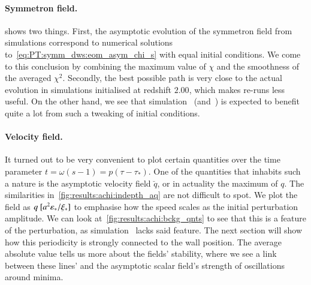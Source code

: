 \paragraph{Symmetron field.} %
 shows two things. First, the asymptotic evolution of the symmetron field from simulations correspond to numerical solutions to~\cref{eq:PT:symm_dws:eom_asym_chi_s} with equal initial conditions. We come to this conclusion by combining the maximum value of $\chi$ and the smoothness of the averaged $\chi^2$. Secondly, the best possible path %
is very close to the actual evolution in simulations initialised at redshift $2.00$, which makes re-runs less useful. On the other hand, we see that simulation~ (and~) is expected to benefit quite a lot from such a tweaking of initial conditions.


\paragraph{Velocity field.} %
It turned out to be very convenient to plot certain quantities over the  time parameter $t = \omega(s-1)=p(\tau-\tau_\ast)$. One of the quantities that inhabits such a nature is the asymptotic velocity field $\breve{q}$, or in actuality the maximum of $q$. %
The similarities in~\cref{fig:results:achi:indepth_aq} are not difficult to spot. We plot the field as $q~[a^2 \varepsilon_\ast/\xi_\ast]$ %
to emphasise how the speed scales as the initial perturbation amplitude. We can look at~\cref{fig:results:achi:bckg_qnts} to see that this is a feature of the perturbation, as simulation~ lacks said feature. The next section will show how this periodicity is strongly connected to the wall position. The average absolute value tells us more about the fields' stability, where we see a link between these lines' and the asymptotic scalar field's strength of oscillations around minima.





